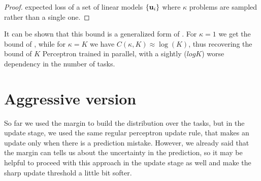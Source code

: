 {\begin{proof}
expected loss of a set of linear models $\{ \mathbf{u}_{i} \}$ where $\kappa$
problems are sampled rather than a single one.
\QED
%
\end{proof}
It can be shown that this bound  is a generalized form of . For $\kappa=1$ we get the bound of , while for
$\kappa=K$ we have $C(\kappa,K)\approx\log(K)$, thus recovering the
bound of $K$ Perceptron trained in parallel, with a sightly ($log K$)
worse dependency in the number of tasks.

\section{Aggressive version}

So far we used the margin to build the distribution over the tasks,  but in the update stage,
we used the same regular perceptron update rule, that makes an update only when there is a prediction 
mistake. However, we already said that the margin can tells us about the uncertainty in the prediction, 
so it may be helpful to proceed with this approach in the update stage as well and make the sharp update 
threshold a little bit softer. 

}
